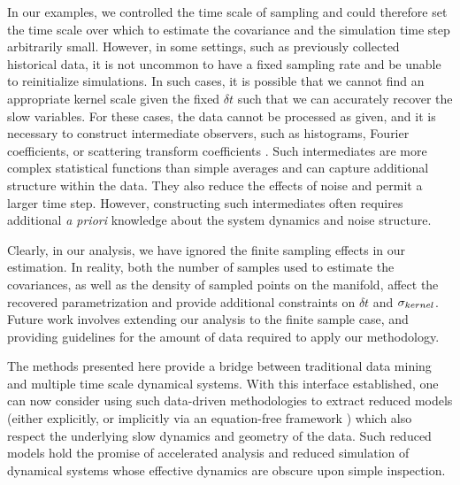 In our examples, we controlled the time scale of sampling and could therefore set the time scale over which to estimate the covariance and the simulation time step arbitrarily small.
%
However, in some settings, such as previously collected historical data, it is not uncommon to have a fixed sampling rate and be unable to reinitialize simulations.
%
In such cases, it is possible that we cannot find an appropriate kernel scale given the fixed $\delta t$ such that we can accurately recover the slow variables.
%
For these cases, the data cannot be processed as given,
and it is necessary to construct intermediate observers,
such as histograms, Fourier coefficients, or scattering transform coefficients \cite{mallat2012group, talmon2014intrinsic, talmon2014manifold}.
%
Such intermediates are more complex statistical functions than simple averages and can capture additional structure within the data.
%
They also reduce the effects of noise and permit a larger time step.
%
However, constructing such intermediates often requires additional {\em a priori} knowledge about the system dynamics and noise structure.

Clearly, in our analysis, we have ignored the finite sampling effects in our estimation.
%
In reality, both the number of samples used to estimate the covariances, as well as the density of sampled points on the manifold, affect the recovered parametrization and provide additional constraints on $\delta t$ and $\sigma_{kernel}$.
%
Future work involves extending our analysis to the finite sample case, and providing guidelines for the amount of data required to apply our methodology.

The methods presented here provide a bridge between traditional data mining and multiple time scale dynamical systems.
%
With this interface established, one can now consider using such data-driven methodologies to extract reduced models (either explicitly, or implicitly via an equation-free framework \cite{erban2006gene, kevrekidis2004equation, kevrekidis2003equation,  kevrekidis2009equation}) which also respect the underlying slow dynamics and geometry of the data.
%
Such reduced models hold the promise of accelerated analysis and reduced simulation of dynamical systems whose effective dynamics are obscure upon simple inspection.

